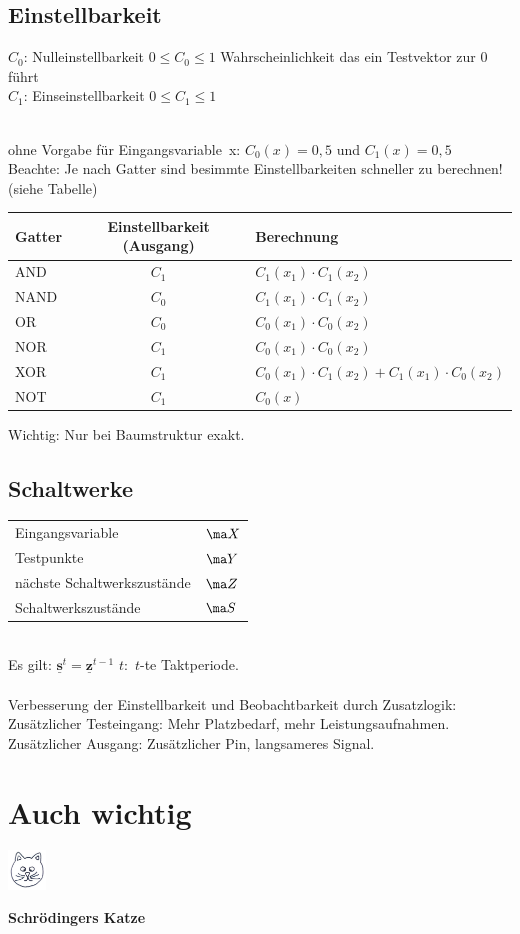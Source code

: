 \documentclass[6pt,a4paper]{scrartcl}
\renewcommand{\emph}[1]{\textsf{\textbf{#1}}}
\renewcommand{\vec}[1]{\ensuremath{\underline{\boldsymbol {#1}}}}
\renewcommand{\vec}[1]{\ensuremath{\underline{\boldsymbol {#1}}}}
\begin{document}
\begin{multicols}{3}
	\subsection{Einstellbarkeit}
	\parbox{2.5cm}{  }
	\parbox{4.0cm}{
		$C_0$: Nulleinstellbarkeit $ 0 \le C_0 \le 1 $ Wahrscheinlichkeit das ein Testvektor zur 0 führt\\
		$C_1$: Einseinstellbarkeit $ 0 \le C_1 \le 1 $
	}\\
	ohne Vorgabe für Eingangsvariable~x: $C_0(x)=0,5$ und $C_1(x)=0,5$\\
	Beachte: Je nach Gatter sind besimmte Einstellbarkeiten schneller zu berechnen! (siehe Tabelle)\\
	\begin{tabular}{l|c|l}
	Gatter & Einstellbarkeit (Ausgang) & Berechnung\\ \midrule
	AND & $C_1$ & $C_1(x_1) \cdot C_1(x_2)$ \\
	NAND & $ C_0$ & $C_1(x_1) \cdot C_1(x_2)$ \\
	OR & $C_0$ & $C_0(x_1) \cdot C_0(x_2)$ \\
	NOR & $C_1$ & $C_0(x_1) \cdot C_0(x_2)$ \\
	XOR & $C_1$ & $C_0(x_1) \cdot C_1(x_2) + C_1(x_1) \cdot C_0(x_2)$ \\
	NOT & $C_1$ & $C_0(x)$ \\
	\end{tabular}
	\newline Wichtig: Nur bei Baumstruktur exakt.\\

	\subsection{Schaltwerke}
	\begin{tabular}{ll}
		Eingangsvariable 			& 		$\ma X$	\\
		Testpunkte 					& 		$\ma Y$	\\
		nächste Schaltwerkszustände & 		$\ma Z$	\\
		Schaltwerkszustände 		&		$\ma S$	\\
	\end{tabular}									\\
	
	Es gilt: $\vec s^t = \vec z^{t-1}$ \qquad $t:$ $t$-te Taktperiode.\\
	\\
	Verbesserung der Einstellbarkeit und Beobachtbarkeit durch Zusatzlogik:\\
	Zusätzlicher Testeingang: Mehr Platzbedarf, mehr Leistungsaufnahmen.\\
	Zusätzlicher Ausgang: Zusätzlicher Pin, langsameres Signal.\\
	
\section{Auch wichtig}
\parbox{1.2cm}{
 \includegraphics[width=1cm]{./cat.jpg}
 }
 \parbox{3cm}{
\emph{Schrödingers Katze}
}
\end{multicols}


\end{document}
